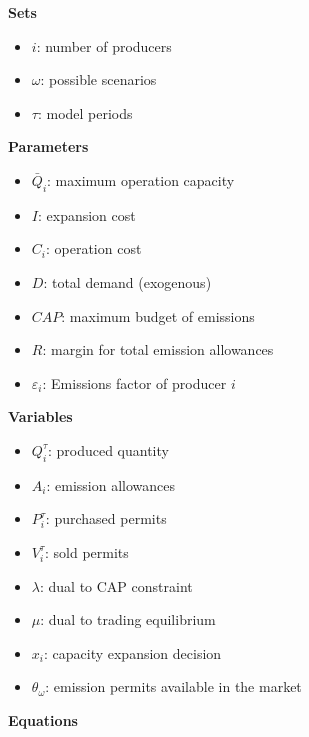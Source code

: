 \documentclass[11pt, letterpaper]{article}
\begin{document}
\begin{flushleft}
\textbf{Sets}
\begin{itemize}
    \item[] $i$: number of producers
    \item[] $\omega$: possible scenarios
    \item[] $\tau$: model periods
    
\end{itemize}

\hspace{0.5cm}

\textbf{Parameters}
\begin{itemize}
   \item[] $\bar{Q}_i$: maximum operation capacity
   \item[] $I$: expansion cost
   \item[] $C_i$: operation cost
   \item[] $D$: total demand (exogenous)
   \item[] $CAP$: maximum budget of emissions 
   \item[] $R$: margin for total emission allowances
 \item[] $\varepsilon_{i}$: Emissions factor of producer $i$
\end{itemize}
\hspace{0.5cm}

\textbf{Variables}
\begin{itemize}
    \item[] $Q^{\tau}_i$: produced quantity
    \item[] $A_i$: emission allowances
    \item[] $P^{\tau}_i$: purchased permits
    \item[] $V^{\tau}_i$: sold permits
    \item[] $\lambda$: dual to CAP constraint
    \item[] $\mu$: dual to trading equilibrium
    \item[] $x_i$: capacity expansion decision
    \item[] $\theta_{\omega}$: emission permits available in the market
    \end{itemize}

\hspace{0.5cm}

\textbf{Equations}
\smallskip


\end{flushleft}
\end{document}
